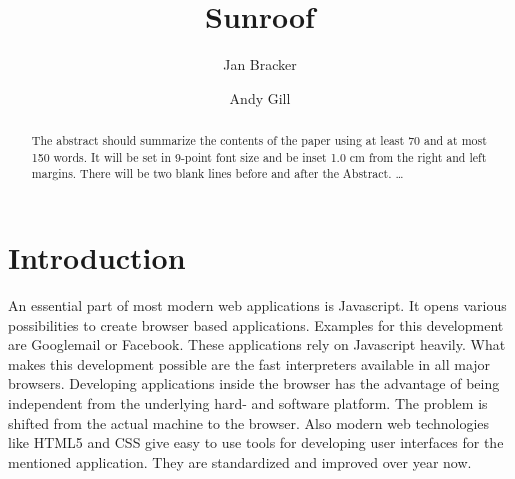 \documentclass{llncs}
\begin{document}
\newcommand{\NOTE}[1]{{\Large\textbf{NOTE:}\ #1}}
%
\title{Sunroof}
%
%
\author{Jan Bracker \and Andy Gill}
%
%
%

\maketitle              %

\begin{abstract}
The abstract should summarize the contents of the paper
using at least 70 and at most 150 words. It will be set in 9-point
font size and be inset 1.0 cm from the right and left margins.
There will be two blank lines before and after the Abstract. \dots
{}
\end{abstract}
%
\section{Introduction}

An essential part of most modern web applications is Javascript.
It opens various possibilities to create browser based applications.
Examples for this development are Googlemail or Facebook.
These applications rely on Javascript heavily. What makes this 
development possible are the fast interpreters available in all
major browsers. Developing applications inside the browser has
the advantage of being independent from the underlying hard- and
software platform. The problem is shifted from the actual machine
to the browser. Also modern web technologies like HTML5 and CSS
give easy to use tools for developing user interfaces for the
mentioned application. They are standardized and improved over year 
now. 
\end{document}
